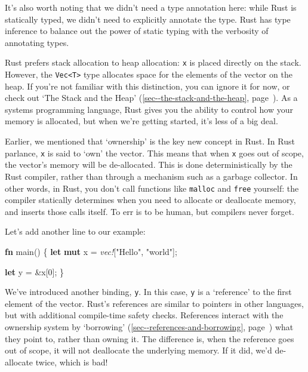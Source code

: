 \documentclass[a4paper,]{book}
\renewcommand*{\hyperref}[2][\ar]{%
  \def\ar{#2}%
  #2 (\autoref{#1}, page~\pageref{#1})}
\newenvironment{Shaded}{\begin{snugshade}}{\end{snugshade}}
\newcommand{\KeywordTok}[1]{\textcolor[rgb]{0.13,0.29,0.53}{\textbf{{#1}}}}
\newcommand{\DecValTok}[1]{\textcolor[rgb]{0.00,0.00,0.81}{{#1}}}
\newcommand{\StringTok}[1]{\textcolor[rgb]{0.31,0.60,0.02}{{#1}}}
\newcommand{\PreprocessorTok}[1]{\textcolor[rgb]{0.56,0.35,0.01}{\textit{{#1}}}}
\newcommand{\NormalTok}[1]{{#1}}
\begin{document}
It's also worth noting that we didn't need a type annotation here: while
Rust is statically typed, we didn't need to explicitly annotate the
type. Rust has type inference to balance out the power of static typing
with the verbosity of annotating types.

Rust prefers stack allocation to heap allocation: \texttt{x} is placed
directly on the stack. However, the
\texttt{Vec\textless{}T\textgreater{}} type allocates space for the
elements of the vector on the heap. If you're not familiar with this
distinction, you can ignore it for now, or check out
\hyperref[sec--the-stack-and-the-heap]{`The Stack and the Heap'}. As a
systems programming language, Rust gives you the ability to control how
your memory is allocated, but when we're getting started, it's less of a
big deal.

Earlier, we mentioned that `ownership' is the key new concept in Rust.
In Rust parlance, \texttt{x} is said to `own' the vector. This means
that when \texttt{x} goes out of scope, the vector's memory will be
de-allocated. This is done deterministically by the Rust compiler,
rather than through a mechanism such as a garbage collector. In other
words, in Rust, you don't call functions like \texttt{malloc} and
\texttt{free} yourself: the compiler statically determines when you need
to allocate or deallocate memory, and inserts those calls itself. To err
is to be human, but compilers never forget.

Let's add another line to our example:

\begin{Shaded}
\begin{Highlighting}[]
\KeywordTok{fn} \NormalTok{main() \{}
    \KeywordTok{let} \KeywordTok{mut} \NormalTok{x = }\PreprocessorTok{vec!}\NormalTok{[}\StringTok{"Hello"}\NormalTok{, }\StringTok{"world"}\NormalTok{];}

    \KeywordTok{let} \NormalTok{y = &x[}\DecValTok{0}\NormalTok{];}
\NormalTok{\}}
\end{Highlighting}
\end{Shaded}

We've introduced another binding, \texttt{y}. In this case, \texttt{y}
is a `reference' to the first element of the vector. Rust's references
are similar to pointers in other languages, but with additional
compile-time safety checks. References interact with the ownership
system by \hyperref[sec--references-and-borrowing]{`borrowing'} what
they point to, rather than owning it. The difference is, when the
reference goes out of scope, it will not deallocate the underlying
memory. If it did, we'd de-allocate twice, which is bad!
\end{document}
